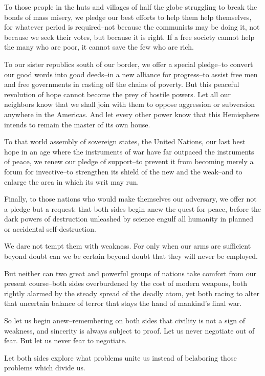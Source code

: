 \documentclass[10pt,a4paper]{article}
\begin{document}
To those people in the huts and villages of half the globe struggling to break the bonds of mass misery, we pledge our best efforts to help them help themselves, for whatever period is required--not because the communists may be doing it, not because we seek their votes, but because it is right. If a free society cannot help the many who are poor, it cannot save the few who are rich.

To our sister republics south of our border, we offer a special pledge--to convert our good words into good deeds--in a new alliance for progress--to assist free men and free governments in casting off the chains of poverty. But this peaceful revolution of hope cannot become the prey of hostile powers. Let all our neighbors know that we shall join with them to oppose aggression or subversion anywhere in the Americas. And let every other power know that this Hemisphere intends to remain the master of its own house.

To that world assembly of sovereign states, the United Nations, our last best hope in an age where the instruments of war have far outpaced the instruments of peace, we renew our pledge of support--to prevent it from becoming merely a forum for invective--to strengthen its shield of the new and the weak--and to enlarge the area in which its writ may run.

Finally, to those nations who would make themselves our adversary, we offer not a pledge but a request: that both sides begin anew the quest for peace, before the dark powers of destruction unleashed by science engulf all humanity in planned or accidental self-destruction.

We dare not tempt them with weakness. For only when our arms are sufficient beyond doubt can we be certain beyond doubt that they will never be employed.

But neither can two great and powerful groups of nations take comfort from our present course--both sides overburdened by the cost of modern weapons, both rightly alarmed by the steady spread of the deadly atom, yet both racing to alter that uncertain balance of terror that stays the hand of mankind's final war.

So let us begin anew--remembering on both sides that civility is not a sign of weakness, and sincerity is always subject to proof. Let us never negotiate out of fear. But let us never fear to negotiate.

Let both sides explore what problems unite us instead of belaboring those problems which divide us.
\end{document}
